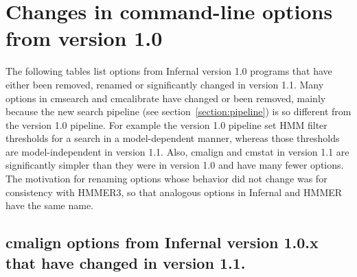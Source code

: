 \section{Changes in command-line options from version 1.0}
\label{section:options}
\setcounter{footnote}{0}

The following tables list options from Infernal version 1.0 programs
that have either been removed, renamed or significantly changed in
version 1.1. Many options in cmsearch and cmcalibrate have changed or
been removed, mainly because the new search pipeline (see
section~\ref{section:pipeline}) is so different from the version 1.0
pipeline. For example the version 1.0 pipeline set HMM filter
thresholds for a search in a model-dependent manner, whereas those
thresholds are model-independent in version 1.1. Also, cmalign and
cmstat in version 1.1 are significantly simpler than they were in
version 1.0 and have many fewer options. The motivation for renaming
options whose behavior did not change was for consistency with
HMMER3, so that analogous options in Infernal and HMMER have the same
name.

\subsection{cmalign options from Infernal version 1.0.x that have changed in version 1.1.} 

